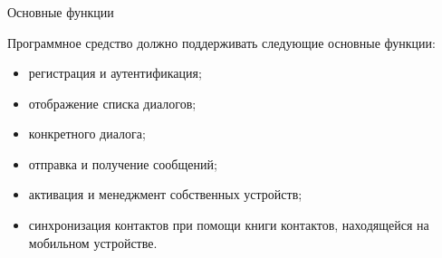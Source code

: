\subsubsection{} Основные функции
\label{sec:analysis:research:req:functions}

Программное средство должно поддерживать следующие основные фун\-к\-ции:

\begin{itemize}
	\item регистрация и аутентификация;
	\item отображение списка диалогов;
	\item конкретного диалога;
	\item отправка и получение сообщений;
	\item активация и менеджмент собственных устройств;
	\item синхронизация контактов при помощи книги контактов, находящейся на мобильном устройстве.
\end{itemize}